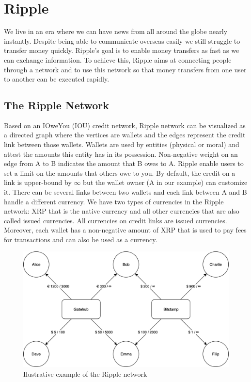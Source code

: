 \section{Ripple}
We live in an era where we can have news from all around the globe nearly instantly. Despite being able to communicate overseas easily we still struggle to transfer money quickly. Ripple's goal is to enable money transfers as fast as we can exchange information. To achieve this, Ripple aims at connecting people through a network and to use this network so that money transfers from one user to another can be executed rapidly. 
\subsection{The Ripple Network}
Based on an IOweYou (IOU) credit network, Ripple network can be visualized as a directed graph where the vertices are wallets and the edges represent the credit link between those wallets. Wallets are used by entities (physical or moral) and attest the amounts this entity has in its possession. Non-negative weight on an edge from A to B indicates the amount that B owes to A. Ripple enable users to set a limit on the amounts that others owe to you. By default, the credit on a link is upper-bound by $\infty$ but the wallet owner (A in our example) can customize it. There can be several links between two wallets and each link between A and B handle a different currency. We have two types of currencies in the Ripple network: XRP that is the native currency and all other currencies that are also called issued currencies. All currencies on credit links are issued currencies. Moreover, each wallet has a non-negative amount of XRP that is used to pay fees for transactions and can also be used as a currency.

\begin{figure}[h!]
\includegraphics[width=\linewidth]{network.png}
\caption{Ilustrative example of the Ripple network}
\label{fig:network}
\end{figure}


